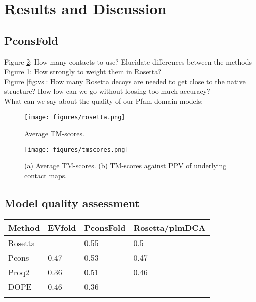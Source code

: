 \documentclass{bioinfo}
\begin{document}
\section{Results and Discussion}

\subsection{PconsFold}

Figure \ref{fig:main}: How many contacts to use? Elucidate differences between the methods \\
Figure \ref{fig:ros}: How strongly to weight them in Rosetta? \\
Figure \ref{fig:vs}: How many Rosetta decoys are needed to get close to the native structure? How low can we go without loosing too much accuracy? \\
What can we say about the quality of our Pfam domain models: \\

\begin{figure}[!tpb]%
    \centerline{\texttt{[image: figures/rosetta.png]}}
\caption{Average TM-scores.}\label{fig:ros}
\end{figure}

\begin{figure}[!tpb]%
    \centerline{\texttt{[image: figures/tmscores.png]}}
\caption{(a) Average TM-scores. (b) TM-scores against PPV of underlying contact maps.}\label{fig:main}
\end{figure}

\subsection{Model quality assessment}

\begin{table}[!t]
{\begin{tabular}{llll}\toprule
    Method  & EVfold & PconsFold & Rosetta/plmDCA \\ \midrule
    Rosetta & --     & 0.55     & 0.5          \\
    Pcons   & 0.47  & 0.53     & 0.47          \\
    Proq2   & 0.36  & 0.51     & 0.46          \\
    DOPE    & 0.46  & 0.36     & ~              \\ \botrule
\end{tabular}}{}
\end{table}
\end{document}

